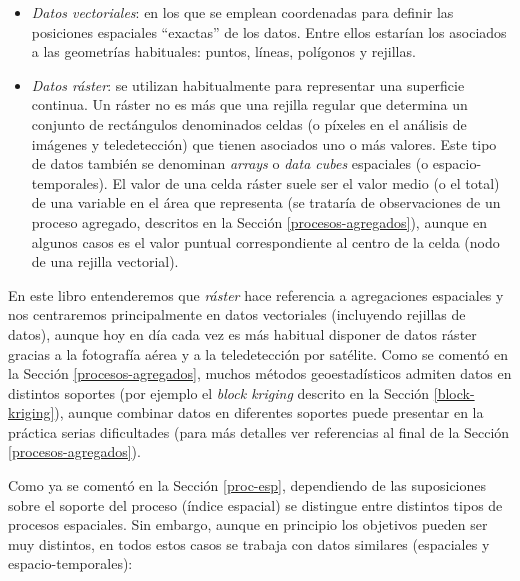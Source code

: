 \documentclass[
  spanish,
]{book}
\theoremstyle{break}
\theoremstyle{definition}
\theoremstyle{definition}
\theoremstyle{definition}
\theoremstyle{definition}
\theoremstyle{remark}
\begin{document}
\begin{itemize}
\item
  \emph{Datos vectoriales}: en los que se emplean coordenadas para definir las posiciones espaciales ``exactas'' de los datos. Entre ellos estarían los asociados a las geometrías habituales: puntos, líneas, polígonos y rejillas.
\item
  \emph{Datos ráster}: se utilizan habitualmente para representar una superficie continua. Un ráster no es más que una rejilla regular que determina un conjunto de rectángulos denominados celdas (o píxeles en el análisis de imágenes y teledetección) que tienen asociados uno o más valores. Este tipo de datos también se denominan \emph{arrays} o \emph{data cubes} espaciales (o espacio-temporales). El valor de una celda ráster suele ser el valor medio (o el total) de una variable en el área que representa (se trataría de observaciones de un proceso agregado, descritos en la Sección \ref{procesos-agregados}), aunque en algunos casos es el valor puntual correspondiente al centro de la celda (nodo de una rejilla vectorial).
\end{itemize}

En este libro entenderemos que \emph{ráster} hace referencia a agregaciones espaciales y nos centraremos principalmente en datos vectoriales (incluyendo rejillas de datos), aunque hoy en día cada vez es más habitual disponer de datos ráster gracias a la fotografía aérea y a la teledetección por satélite.
Como se comentó en la Sección \ref{procesos-agregados}, muchos métodos geoestadísticos admiten datos en distintos soportes (por ejemplo el \emph{block kriging} descrito en la Sección \ref{block-kriging}), aunque combinar datos en diferentes soportes puede presentar en la práctica serias dificultades (para más detalles ver referencias al final de la Sección \ref{procesos-agregados}).

Como ya se comentó en la Sección \ref{proc-esp}, dependiendo de las suposiciones sobre el soporte del proceso (índice espacial) se distingue entre distintos tipos de procesos espaciales.
Sin embargo, aunque en principio los objetivos pueden ser muy distintos, en todos estos casos se trabaja con datos similares (espaciales y espacio-temporales):
\end{document}
